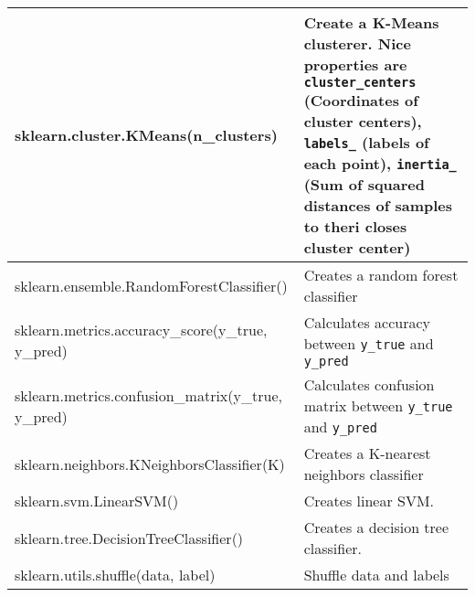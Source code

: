 \begin{tabularx}{\textwidth}{t{8cm} X}
    \hline
    sklearn.cluster.KMeans(n\_clusters)                 & Create a K-Means clusterer. Nice properties are \texttt{cluster\_centers} (Coordinates of cluster centers), \texttt{labels\_} (labels of each point), \texttt{inertia\_} (Sum of squared distances of samples to theri closes cluster center) \\\hline

    sklearn.ensemble.RandomForestClassifier()           & Creates a random forest classifier                                                                                                                                                                                                            \\\hline

    sklearn.metrics.accuracy\_score(y\_true, y\_pred)   & Calculates accuracy between \texttt{y\_true} and \texttt{y\_pred}                                                                                                                                                                             \\\hline
    sklearn.metrics.confusion\_matrix(y\_true, y\_pred) & Calculates confusion matrix between \texttt{y\_true} and \texttt{y\_pred}                                                                                                                                                                     \\\hline

    sklearn.neighbors.KNeighborsClassifier(K)           & Creates a K-nearest neighbors classifier                                                                                                                                                                                                      \\\hline

    sklearn.svm.LinearSVM()                             & Creates linear SVM.                                                                                                                                                                                                                           \\\hline

    sklearn.tree.DecisionTreeClassifier()               & Creates a decision tree classifier.                                                                                                                                                                                                           \\\hline

    sklearn.utils.shuffle(data, label)                  & Shuffle data and labels                                                                                                                                                                                                                       \\\hline
\end{tabularx}

